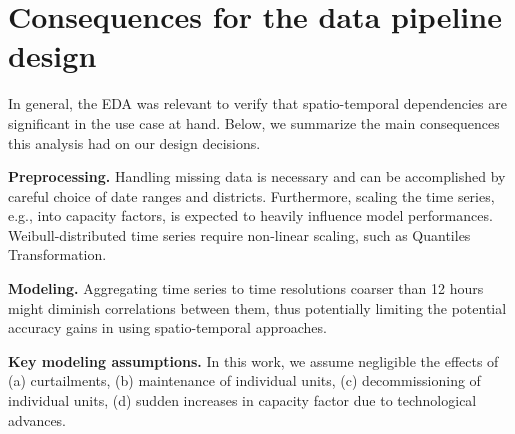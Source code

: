 \section{Consequences for the data pipeline design}\label{sec:eda_conclusions}

In general, the EDA was relevant to verify that spatio-temporal dependencies are significant in the use case at hand.
Below, we summarize the main consequences this analysis had on our design decisions.

\vspace{1em}
\noindent
\textbf{Preprocessing.} Handling missing data is necessary and can be accomplished by careful choice of date ranges and districts. Furthermore, scaling the time series, e.g., into capacity factors, is expected to heavily influence model performances.
Weibull-distributed time series require non-linear scaling, such as Quantiles Transformation.

\vspace{1em}
\noindent
\textbf{Modeling.} Aggregating time series to time resolutions coarser than 12 hours might diminish correlations between them, thus potentially limiting the potential accuracy gains in using spatio-temporal approaches.

\vspace{1em}
\noindent
\textbf{Key modeling assumptions.} In this work, we assume negligible the effects of (a) curtailments, (b) maintenance of individual units, (c) decommissioning of individual units, (d) sudden increases in capacity factor due to technological advances.
